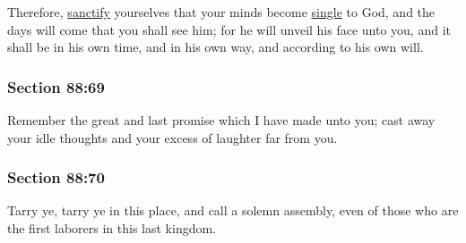 		Therefore, \hyperref[SANCTIFICATION]{sanctify} yourselves that your minds become \hyperref[SINGLE]{single} to God, and the days will come that you shall see him; for he will unveil his face unto you, and it shall be in his own time, and in his own way, and according to his own will.


	\subsubsection{Section 88:69} %
		\label{DC88-69}

		Remember the great and last promise which I have made unto you; cast away your idle thoughts and your excess of laughter far from you.


	\subsubsection{Section 88:70} %
		\label{DC88-70}

		Tarry ye, tarry ye in this place, and call a solemn assembly, even of those who are the first laborers in this last kingdom.


